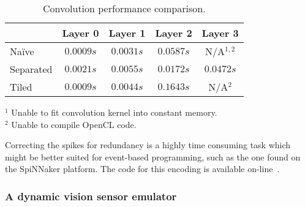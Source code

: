 \begin{table}[hbt]
  \begin{center}
    \caption{Convolution performance comparison.}
    \bgroup
    \def\arraystretch{1.4}
    \begin{tabular}{l c c c c}
      &
      \begin{minipage}{2cm}\centering Layer 0\vspace*{0.1cm}\end{minipage} & 
      \begin{minipage}{2cm}\centering
        Layer 1\vspace*{0.1cm}\end{minipage}& 
      \begin{minipage}{2cm}\centering
        Layer 2\vspace*{0.1cm}\end{minipage}& 
      \begin{minipage}{2cm}\centering
        Layer 3\vspace*{0.1cm}\end{minipage}\\
      \hline 
      
      Naïve     & $0.0009 s$ & $0.0031 s$ & $0.0587 s$ & N/A$^{1,2}$ \\ 
      Separated & $0.0021 s$ & $0.0055 s$ & $0.0172 s$ & $0.0472 s$ \\ 
      Tiled     & $0.0009 s$ & $0.0044 s$ & $0.1643 s$ & N/A$^2$\\
    \end{tabular} 
    \egroup
    {
      \footnotesize 
      \begin{center}
        $^1$ Unable to fit convolution kernel into constant memory.\\
        $^2$ Unable to compile OpenCL code.
      \end{center}
    }
  \end{center}
  \vspace*{-5pt}
\end{table}

Correcting the spikes for redundancy is a highly time consuming task which
might be better suited for event-based programming, such as the one found on 
the SpiNNaker platform. The code for this encoding is available on-line~\cite{focal-code}.


\subsubsection{A dynamic vision sensor emulator}

